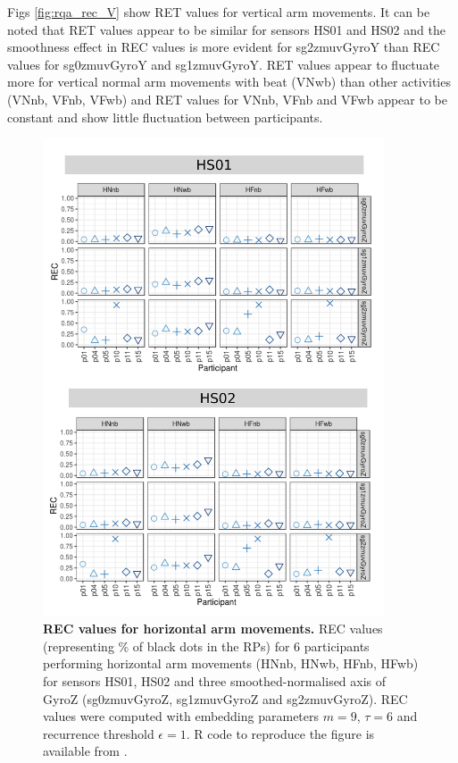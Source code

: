 Figs \ref{fig:rqa_rec_V} show RET values for vertical arm movements.
It can be noted that RET values appear to be similar for sensors HS01 and HS02
and the smoothness effect in REC values is more evident for sg2zmuvGyroY 
than REC values for sg0zmuvGyroY and sg1zmuvGyroY.
RET values appear to fluctuate more for vertical normal arm movements with 
beat (VNwb) than other activities (VNnb, VFnb, VFwb) and  RET values for 
VNnb, VFnb and VFwb appear to be constant and show little fluctuation 
between participants.
\begin{figure}[!h]
\centering
\includegraphics[width=0.9\textwidth]{rqa_rec_H_w500}
    \caption{
	{\bf REC values for horizontal arm movements.}	
	REC values (representing \% of black dots in the RPs) for 
	6 participants performing horizontal arm movements 
	(HNnb, HNwb, HFnb, HFwb)
	for sensors HS01, HS02 and three smoothed-normalised axis 
	of GyroZ (sg0zmuvGyroZ, sg1zmuvGyroZ and sg2zmuvGyroZ).
	REC values were computed with 
	embedding parameters $m=9$, $\tau=6$ and recurrence threshold
	$\epsilon=1$.
	R code to reproduce the figure is available from \cite{hwum2018}.
        }
    \label{fig:rqa_rec_H}
\end{figure}
